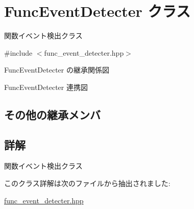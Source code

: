 \hypertarget{class_func_event_detecter}{}\section{Func\+Event\+Detecter クラス}
\label{class_func_event_detecter}


関数イベント検出クラス  




{\ttfamily \#include $<$func\+\_\+event\+\_\+detecter.\+hpp$>$}



Func\+Event\+Detecter の継承関係図


Func\+Event\+Detecter 連携図
\subsection*{その他の継承メンバ}


\subsection{詳解}
関数イベント検出クラス 

このクラス詳解は次のファイルから抽出されました\+:\begin{DoxyCompactItemize}
\item 
\mbox{\hyperlink{func__event__detecter_8hpp}{func\+\_\+event\+\_\+detecter.\+hpp}}\end{DoxyCompactItemize}
